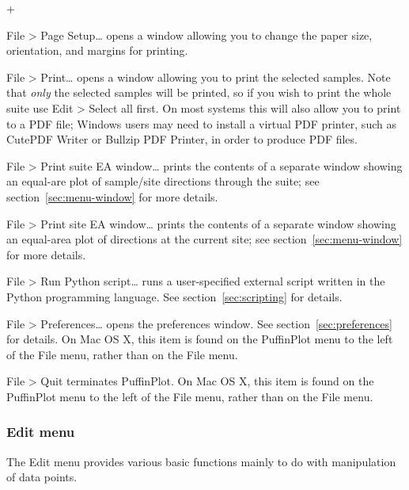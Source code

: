 \documentclass[a4paper,british]{article}
\newcommand{\menuitemlabel}[1]{%
\mbox{\textsf{#1}}\hfil}
\newenvironment{menuitemlist}%
{\begin{list}{}{%
\renewcommand{\makelabel}{\menuitemlabel}%
\setlength{\labelwidth}{35pt}%
\setlength{\leftmargin}%
             {\labelwidth+\labelsep}}}%
{\end{list}}
\newcommand{\ppcmd}[1]{\textsf{#1}} %
\newcommand{\caps}[1]{\MakeTextUppercase{#1}} %
\newcommand{\submenu}{ \textgreater{} } %
\begin{document}
\begin{menuitemlist}
\item[File\submenu Page Setup\ldots] opens a window allowing you
to change the paper size, orientation, and margins for printing.

\item[File\submenu Print\ldots] opens a window allowing you to print the
  selected samples. Note that {\em only} the selected samples will be
  printed, so if you wish to print the whole suite use \ppcmd{Edit\submenu
    Select all} first. On most systems this will also allow you to print to a
  \caps{pdf} file; Windows users may need to install a virtual \caps{pdf}
  printer, such as Cute\caps{pdf} Writer or Bullzip \caps{pdf} Printer, in
  order to produce \caps{pdf} files.

\item[File\submenu Print suite EA window\ldots] prints the contents of a
  separate window showing an equal-are plot of sample/site directions through
  the suite; see section~\ref{sec:menu-window} for more details.

\item[File\submenu Print site EA window\ldots] prints the contents of a
  separate window showing an equal-area plot of directions at the current
  site; see section~\ref{sec:menu-window} for more details.

\item[File\submenu Run Python script\ldots] runs a user-specified
  external script written in the Python programming language.
  See section~\ref{sec:scripting} for details.

\item[File\submenu Preferences\ldots] opens the preferences window. See
  section~\ref{sec:preferences} for details. On Mac OS X, this item is found
  on the \ppcmd{PuffinPlot} menu to the left of the \ppcmd{File} menu, rather
  than on the \ppcmd{File} menu.

\item[File\submenu Quit] terminates PuffinPlot. On Mac OS X, this item is
  found on the \ppcmd{PuffinPlot} menu to the left of the \ppcmd{File} menu,
  rather than on the \ppcmd{File} menu.

\end{menuitemlist}

\subsubsection{Edit menu}

The \ppcmd{Edit} menu provides various basic functions mainly
to do with manipulation of data points.
\end{document}
